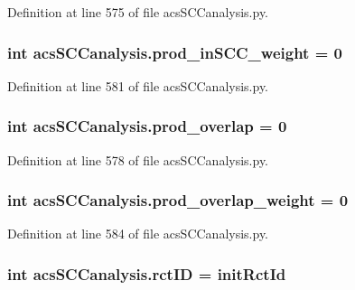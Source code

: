 Definition at line 575 of file acs\-S\-C\-Canalysis.\-py.

\hypertarget{a00128_aa22adccedd9ae548d0687df507ebd92d}{
\subsubsection[{prod\-\_\-in\-S\-C\-C\-\_\-weight}]{\setlength{\rightskip}{0pt plus 5cm}int acs\-S\-C\-Canalysis.\-prod\-\_\-in\-S\-C\-C\-\_\-weight = 0}}\label{a00128_aa22adccedd9ae548d0687df507ebd92d}


Definition at line 581 of file acs\-S\-C\-Canalysis.\-py.

\hypertarget{a00128_a213e964195f0666d00663ca874a09caa}{
\subsubsection[{prod\-\_\-overlap}]{\setlength{\rightskip}{0pt plus 5cm}int acs\-S\-C\-Canalysis.\-prod\-\_\-overlap = 0}}\label{a00128_a213e964195f0666d00663ca874a09caa}


Definition at line 578 of file acs\-S\-C\-Canalysis.\-py.

\hypertarget{a00128_ab78b07d6cd1a94356c4fee43dfc1272a}{
\subsubsection[{prod\-\_\-overlap\-\_\-weight}]{\setlength{\rightskip}{0pt plus 5cm}int acs\-S\-C\-Canalysis.\-prod\-\_\-overlap\-\_\-weight = 0}}\label{a00128_ab78b07d6cd1a94356c4fee43dfc1272a}


Definition at line 584 of file acs\-S\-C\-Canalysis.\-py.

\hypertarget{a00128_a78ffc7d3b69c53ec5389a151e7fdcb83}{
\subsubsection[{rct\-I\-D}]{\setlength{\rightskip}{0pt plus 5cm}int acs\-S\-C\-Canalysis.\-rct\-I\-D = {\bf init\-Rct\-Id}}}\label{a00128_a78ffc7d3b69c53ec5389a151e7fdcb83}


